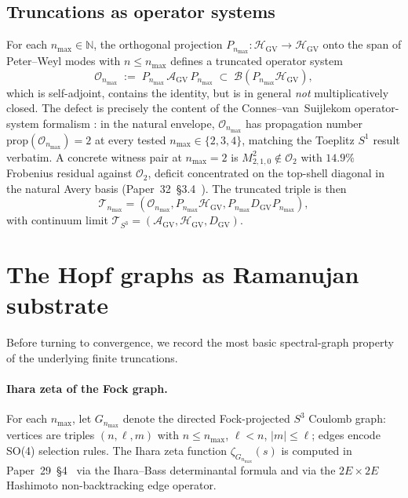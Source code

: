 \documentclass[11pt,a4paper]{article}
\theoremstyle{plain}
\theoremstyle{definition}
\newcommand{\nmax}{n_{\max}}
\newcommand{\sthree}{S^{3}}
\newcommand{\HGV}{\mathcal{H}_{\mathrm{GV}}}
\newcommand{\AGV}{\mathcal{A}_{\mathrm{GV}}}
\newcommand{\DGV}{D_{\mathrm{GV}}}
\newcommand{\Op}{\mathcal{O}}
\newcommand{\Tcal}{\mathcal{T}}
\newcommand{\N}{\mathbb{N}}
\begin{document}
\subsection{Truncations as operator systems}

For each $\nmax \in \N$, the orthogonal projection
$P_{\nmax}: \HGV \to \HGV$ onto the span of Peter--Weyl modes with
$n \le \nmax$ defines a truncated operator system
\begin{equation}
\Op_{\nmax}
\;:=\;
P_{\nmax} \, \AGV \, P_{\nmax}
\;\subset\;
\mathcal{B}(P_{\nmax}\HGV),
\label{eq:operator_system}
\end{equation}
which is self-adjoint, contains the identity, but is in general
\emph{not} multiplicatively closed.  The defect is precisely the
content of the Connes--van~Suijlekom operator-system formalism
\cite{connes_vs2021}: in the natural envelope, $\Op_{\nmax}$ has
propagation number $\mathrm{prop}(\Op_{\nmax}) = 2$ at every tested
$\nmax \in \{2, 3, 4\}$, matching the Toeplitz $S^{1}$
result \cite[Proposition 4.2]{connes_vs2021} verbatim.  A concrete
witness pair at $\nmax = 2$ is $M_{2,1,0}^{2} \notin \Op_{2}$ with
$14.9\%$ Frobenius residual against $\Op_{2}$, deficit concentrated
on the top-shell diagonal in the natural Avery basis
(Paper~32~\S 3.4~\cite{paper32}).  The truncated triple is then
\begin{equation*}
\Tcal_{\nmax} = (\Op_{\nmax}, P_{\nmax}\HGV, P_{\nmax}\DGV P_{\nmax}),
\end{equation*}
with continuum limit
$\Tcal_{\sthree} = (\AGV, \HGV, \DGV)$.

\section{The Hopf graphs as Ramanujan substrate}
\label{sec:ramanujan}

Before turning to convergence, we record the most basic
spectral-graph property of the underlying finite truncations.

\paragraph{Ihara zeta of the Fock graph.}
For each $\nmax$, let $G_{\nmax}$ denote the directed Fock-projected
$\sthree$ Coulomb graph: vertices are triples $(n, \ell, m)$ with
$n \le \nmax$, $\ell < n$, $|m| \le \ell$; edges encode SO(4)
selection rules.  The Ihara zeta function $\zeta_{G_{\nmax}}(s)$ is
computed in Paper~29~\S 4~\cite{paper29} via the Ihara--Bass
determinantal formula and via the $2E \times 2E$ Hashimoto
non-backtracking edge operator.
\end{document}
